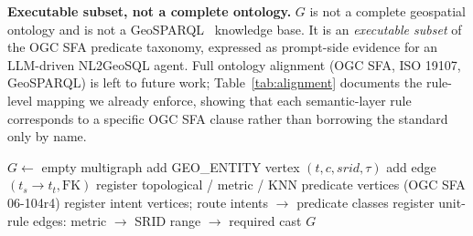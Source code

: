 \documentclass[11pt]{article}
\begin{document}
\noindent\textbf{Executable subset, not a complete ontology.} $G$ is not a
complete geospatial ontology and is not a GeoSPARQL~\cite{ogcgeosparql}
knowledge base. It is an \emph{executable subset} of the OGC SFA predicate
taxonomy, expressed as prompt-side evidence for an LLM-driven NL2GeoSQL
agent. Full ontology alignment (OGC SFA, ISO 19107, GeoSPARQL) is left to
future work; Table~\ref{tab:alignment} documents the rule-level mapping
we already enforce, showing that each semantic-layer rule corresponds to a
specific OGC SFA clause rather than borrowing the standard only by name.

\begin{algorithm}[t]
\caption{\textsc{BuildSemanticGraph}($\mathit{schema}, \mathit{prefix}$)}
\label{alg:build-graph}
\begin{algorithmic}[1]
\STATE $G \gets$ empty multigraph
    \STATE add GEO\_ENTITY vertex $(t, c, \mathit{srid}, \tau)$
  \ENDIF
\ENDFOR
{}
  \STATE add edge $(t_s \to t_t, \text{FK})$
\ENDFOR
\STATE register topological / metric / KNN predicate vertices (OGC SFA 06-104r4)
\STATE register intent vertices; route intents $\to$ predicate classes
\STATE register unit-rule edges: metric $\to$ SRID range $\to$ required cast
\RETURN $G$
\end{algorithmic}
\end{algorithm}
\end{document}
